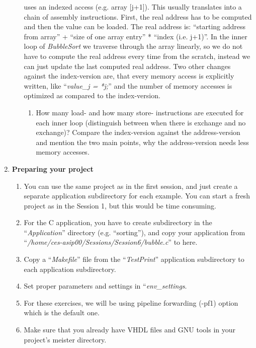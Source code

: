 \begin{enumerate}
\begin{enumerate}
		uses an indexed access (e.g. array {[}j+1{]}). This usually
		translates into a chain of assembly instructions. First, the real
		address has to be computed and then the value can be loaded. The
		real address is: ``starting address from array'' + ``size of one
		array entry'' * ``index (i.e. j+1)''. In the inner loop of
		\emph{BubbleSort} we traverse through the array linearly, so we do
		not have to compute the real address every time from the scratch,
		instead we can just update the last computed real address. Two other
		changes against the index-version are, that every memory access is
		explicitly written, like ``\emph{value\_j = *j;}'' and the number of
		memory accesses is optimized as compared to the index-version.
		\begin{enumerate}[label=(\alph*),start=2]
			\color{red}\item\normalcolor
			How many load- and how many store- instructions are executed for each
			inner loop (distinguish between when there is exchange and no
			exchange)? Compare the index-version against the address-version and
			mention the two main points, why the address-version needs less memory
			accesses.
		\end{enumerate}
	\end{enumerate}
\item \textbf{Preparing your project}
	\begin{enumerate}
		\item
		You can use the same project as in the first session, and just
		create a separate application subdirectory for each example. You can
		start a fresh project as in the Session 1, but this would be time
		consuming.
		\item
		For the C application, you have to create subdirectory in the
		``\emph{Application}'' directory (e.g. ``sorting''), and copy your
		application from ``\emph{/home/ces-asip00/Sessions/Session6/bubble.c}''
		to here.
		\item
		Copy a ``\emph{Makefile}'' file from the ``\emph{TestPrint}''
		application subdirectory to each application subdirectory.
		\item
		Set proper parameters and settings in ``\emph{env\_settings}.
		\item
		For these exercises, we will be using pipeline forwarding (-pf1)
		option which is the default one.
		\item
		Make sure that you already have VHDL files and GNU tools in your
		project's meister directory.
	\end{enumerate}

\end{enumerate}

